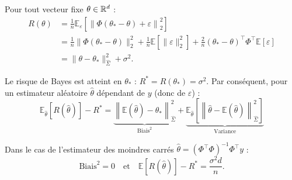 \begin{proposition}
    Pour tout vecteur fixe $\theta \in \mathbb{R}^d$ :
    \begin{align*}
        R(\theta) &= \frac{1}{n} \mathbb{E}_\varepsilon \left[ \left\| \Phi (\theta_* - \theta) + \varepsilon \right\|_2^2 \right] \\
        &= \frac{1}{n} \|\Phi (\theta_* - \theta)\|_2^2 + \frac{1}{n} \mathbb{E}\left[\|\varepsilon\|_2^2\right] + \frac{2}{n} (\theta_* - \theta)^\top \Phi^\top \mathbb{E}[\varepsilon] \\
        &= \|\theta - \theta_*\|_{\hat{\Sigma}}^2 + \sigma^2.
    \end{align*}

    
    Le risque de Bayes est atteint en $\theta_*$ : $R^* = R(\theta_*) = \sigma^2$. Par conséquent, pour un estimateur aléatoire $\hat{\theta}$ dépendant de $y$ (donc de $\varepsilon$) :
    \begin{equation}
        \boxed{\mathbb{E}_{\hat{\theta}}\left[ R(\hat{\theta}) \right] - R^* = \underbrace{\left\| \mathbb{E}(\hat{\theta}) - \theta_* \right\|_{\hat{\Sigma}}^2}_{\text{Biais}^2} + \underbrace{\mathbb{E}_{\hat{\theta}}\left[ \left\| \hat{\theta} - \mathbb{E}(\hat{\theta}) \right\|_{\hat{\Sigma}}^2 \right]}_{\text{Variance}}}
    \end{equation}
\end{proposition}

\begin{theorem}
    Dans le cas de l'estimateur des moindres carrés $\hat{\theta} = (\Phi^\top \Phi)^{-1} \Phi^\top y$ :
    \begin{equation}
        \text{Biais}^2 = 0 \quad \text{et} \quad \mathbb{E}\left[ R(\hat{\theta}) \right] - R^* = \frac{\sigma^2 d}{n}.
    \end{equation}
\end{theorem}

